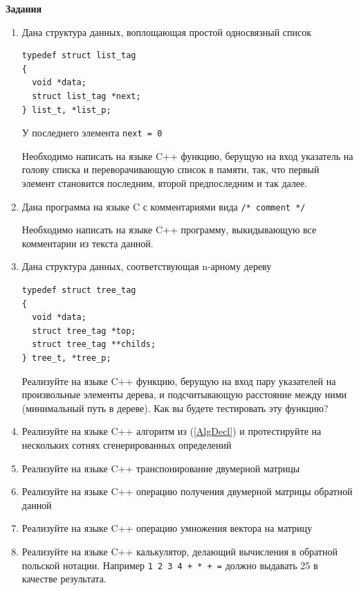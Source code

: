 \documentclass[a4paper,12pt,oneside]{book}
\begin{document}
\textbf{Задания} 

\begin{enumerate}
\item
Дана структура данных, воплощающая простой односвязный список

\begin{lstlisting}
typedef struct list_tag
{
  void *data;
  struct list_tag *next;
} list_t, *list_p;
\end{lstlisting}

У последнего элемента \lstinline!next = 0!

Необходимо написать на языке C++ функцию, берущую на вход указатель на голову списка и переворачивающую список в памяти, так, что первый элемент становится последним, второй предпоследним и так далее.

\item
Дана программа на языке C с комментариями вида \lstinline!/* comment */!

Необходимо написать на языке C++ программу, выкидывающую все комментарии из текста данной.

\item
Дана структура данных, соответствующая n-арному дереву

\begin{lstlisting}
typedef struct tree_tag
{
  void *data;
  struct tree_tag *top;
  struct tree_tag **childs;
} tree_t, *tree_p;
\end{lstlisting}

Реализуйте на языке C++ функцию, берущую на вход пару указателей на произвольные элементы дерева, и подсчитывающую расстояние между ними (минимальный путь в дереве). Как вы будете тестировать эту функцию?

\item
Реализуйте на языке C++ алгоритм из (\ref{AlgDecl}) и протестируйте на нескольких сотнях сгенерированных определений

\item
Реализуйте на языке C++ транспонирование двумерной матрицы

\item
Реализуйте на языке C++ операцию получения двумерной матрицы обратной данной

\item
Реализуйте на языке C++ операцию умножения вектора на матрицу

\item
Реализуйте на языке C++ калькулятор, делающий вычисления в обратной польской нотации. Например \lstinline!1 2 3 4 + * + =! должно выдавать 25 в качестве результата.


\end{enumerate}
\end{document}
